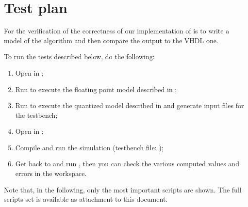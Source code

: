 \chapter{Test plan}\label{ch:test}

For the verification of the correctness of our implementation of
\cordic{} is to write a \matlab{} model of the algorithm and then compare the
output to the VHDL one.

To run the tests described below, do the following:
\begin{enumerate}
	\item Open  in \matlab;
	\item Run  to execute the floating point model
		described in ;
	\item Run  to execute the quantized model
		described in  and generate input files for
		the \modelsim{} testbench;
	\item Open  in \modelsim;
	\item Compile and run the simulation (testbench file:
		);
	\item Get back to \matlab{} and run ,
		then you can check the various computed values and errors in the
		\matlab{} workspace.
\end{enumerate}

Note that, in the following, only the most important \matlab{} scripts are
shown. The full \matlab{} scripts set is available as attachment to this
document.




